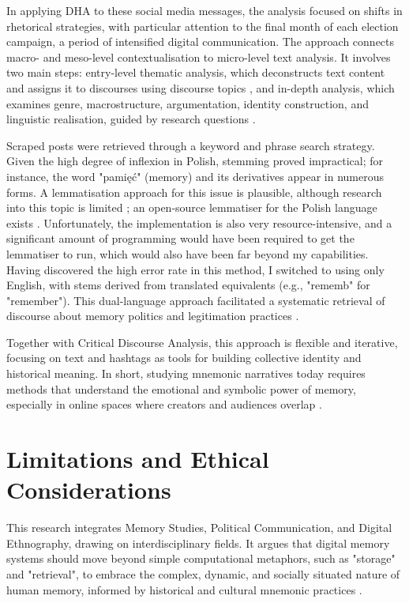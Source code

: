 In applying DHA to these social media messages, the analysis focused on shifts in rhetorical strategies, with particular attention to the final month of each election campaign, a period of intensified digital communication. The approach connects macro- and meso-level contextualisation to micro-level text analysis. It involves two main steps: entry-level thematic analysis, which deconstructs text content and assigns it to discourses using discourse topics \citep{van_dijk_principles_1993}, and in-depth analysis, which examines genre, macrostructure, argumentation, identity construction, and linguistic realisation, guided by research questions \citep{reisigl_discourse_2001}.

Scraped posts were retrieved through a keyword and phrase search strategy. Given the high degree of inflexion in Polish, stemming proved impractical; for instance, the word "pamięć" (memory) and its derivatives appear in numerous forms. A lemmatisation approach for this issue is plausible, although research into this topic is limited \citep{krasnowska2019empirical}; an open-source lemmatiser for the Polish language exists \citep{gawinecki_lemmatizer-pl}. Unfortunately, the implementation is also very resource-intensive, and a significant amount of programming would have been required to get the lemmatiser to run, which would also have been far beyond my capabilities. Having discovered the high error rate in this method, I switched to using only English, with stems derived from translated equivalents (e.g., "rememb" for "remember"). This dual-language approach facilitated a systematic retrieval of discourse about memory politics and legitimation practices \citep{karwatowski_context_2022}.

Together with Critical Discourse Analysis, this approach is flexible and iterative, focusing on text and hashtags as tools for building collective identity and historical meaning. In short, studying mnemonic narratives today requires methods that understand the emotional and symbolic power of memory, especially in online spaces where creators and audiences overlap \citep{matthes_digital_2017}.

\section{Limitations and Ethical Considerations}

This research integrates Memory Studies, Political Communication, and Digital Ethnography, drawing on interdisciplinary fields. It argues that digital memory systems should move beyond simple computational metaphors, such as "storage" and "retrieval", to embrace the complex, dynamic, and socially situated nature of human memory, informed by historical and cultural mnemonic practices \citep{van_house_technologies_2008}.

